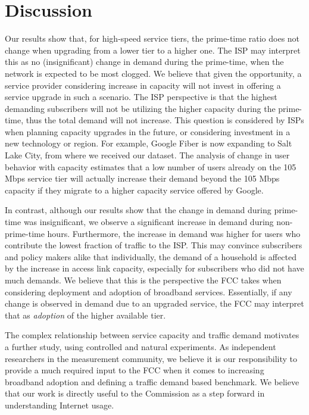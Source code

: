 \section{Discussion}\label{sec:discussion}

Our results show that, for high-speed service tiers, the 
prime-time ratio does not change when upgrading from a lower tier to a higher 
one. The ISP may interpret this as no (insignificant) change in demand during 
the prime-time, when the network is expected to be most clogged. We
believe that given the opportunity, a service provider considering increase in 
capacity will not invest in offering a service upgrade in such a scenario. The 
ISP perspective is that the highest demanding subscribers will not be utilizing 
the higher capacity during the prime-time, thus the total demand will not 
increase. This question is considered by ISPs when planning capacity upgrades 
in the future, or considering investment in a new technology or region. For 
example, Google Fiber is now expanding to Salt Lake City, from where 
we received our dataset. The analysis of change in user behavior with capacity 
estimates that a low number of users already on the 105 Mbps service tier will 
actually increase their demand beyond the 105 Mbps capacity if they 
migrate to a higher capacity service offered by Google. 

In contrast, although our results show that the change in demand during 
prime-time was insignificant, we observe a significant increase in demand 
during non-prime-time hours. Furthermore, the increase in demand was higher for 
users who contribute the lowest fraction of traffic to the ISP. This may 
convince subscribers and policy makers alike that individually, the demand of a 
household is affected by the increase in access link capacity, especially for 
subscribers who did not have much demands. We believe that this is the 
perspective the FCC takes when considering deployment and adoption of 
broadband services. Essentially, if any change is observed in demand due to an 
upgraded service, the FCC may interpret that as \emph{adoption} of the higher 
available tier.

The complex relationship between service capacity and traffic demand motivates 
a further study, using controlled and natural experiments. As independent 
researchers in the measurement community, we believe it is our responsibility 
to 
provide a much required input to the FCC when it comes to increasing broadband 
adoption and defining a traffic demand based benchmark. We believe that our work 
is
directly useful to the Commission as a step forward in understanding Internet 
usage.